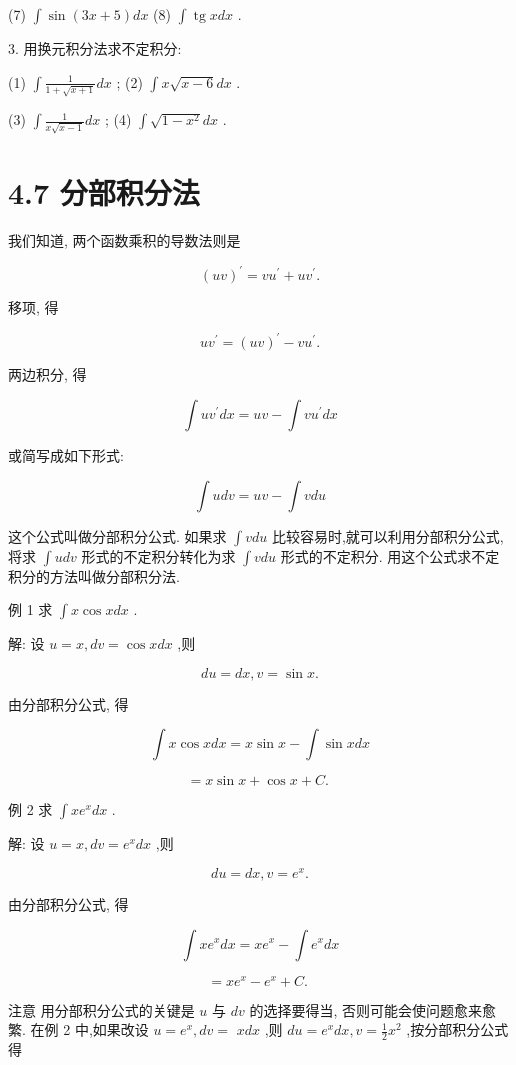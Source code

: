 \documentclass[10pt]{article}
\begin{document}
(7) \(\int \sin \left( {{3x} + 5}\right) {dx}\) (8) \(\int \operatorname{tg}{xdx}\) .

3. 用换元积分法求不定积分:

(1) \(\int \frac{1}{1 + \sqrt{x + 1}}{dx}\) ; (2) \(\int x\sqrt{x - 6}{dx}\) .

(3) \(\int \frac{1}{x\sqrt{x - 1}}{dx}\) ; (4) \(\int \sqrt{1 - {x}^{2}}{dx}\) .

\section*{4.7 分部积分法}

我们知道, 两个函数乘积的导数法则是

\[
{\left( uv\right) }^{\prime } = v{u}^{\prime } + u{v}^{\prime }.
\]

移项, 得

\[
u{v}^{\prime } = {\left( uv\right) }^{\prime } - v{u}^{\prime }.
\]

两边积分, 得

\[
\int u{v}^{\prime }{dx} = {uv} - \int v{u}^{\prime }{dx}
\]

或简写成如下形式:

\[
\int {udv} = {uv} - \int {vdu}
\]

这个公式叫做分部积分公式. 如果求 \(\int {vdu}\) 比较容易时,就可以利用分部积分公式,将求 \(\int {udv}\) 形式的不定积分转化为求 \(\int {vdu}\) 形式的不定积分. 用这个公式求不定积分的方法叫做分部积分法.

例 1 求 \(\int x\cos {xdx}\) .

解: 设 \(u = x,{dv} = \cos {xdx}\) ,则

\[
{du} = {dx},v = \sin x.
\]

由分部积分公式, 得

\[
\int x\cos {xdx} = x\sin x - \int \sin {xdx}
\]

\[
= x\sin x + \cos x + C\text{. }
\]

例 2 求 \(\int x{e}^{x}{dx}\) .

解: 设 \(u = x,{dv} = {e}^{x}{dx}\) ,则

\[
{du} = {dx},v = {e}^{x}.
\]

由分部积分公式, 得

\[
\int x{e}^{x}{dx} = x{e}^{x} - \int {e}^{x}{dx}
\]

\[
= x{e}^{x} - {e}^{x} + C\text{. }
\]

注意 用分部积分公式的关键是 \(u\) 与 \({dv}\) 的选择要得当, 否则可能会使问题愈来愈繁. 在例 2 中,如果改设 \(u = {e}^{x},{dv} =\) \({xdx}\) ,则 \({du} = {e}^{x}{dx},v = \frac{1}{2}{x}^{2}\) ,按分部积分公式得
\end{document}
